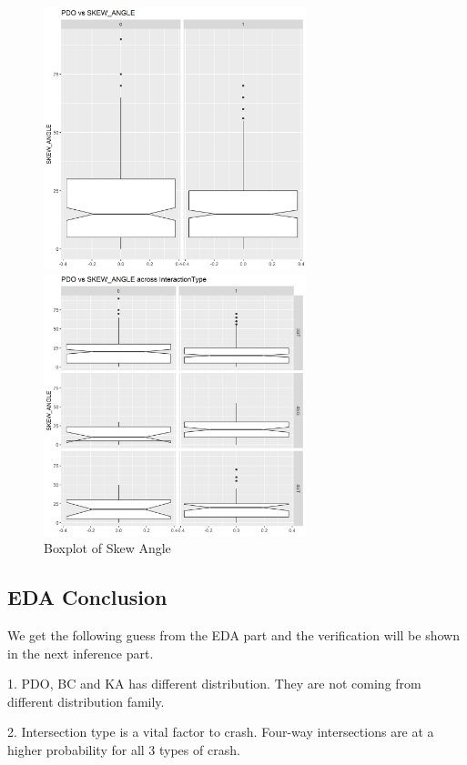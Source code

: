 \documentclass[11pt]{scrartcl} %
\begin{document}
\begin{figure}[H]
\begin{minipage}[t]{0.5\linewidth}
\centering
\includegraphics[width=3in]{image/angle_all_pdo.png}
\small
\end{minipage}
\begin{minipage}[t]{0.5\linewidth}
\centering
\includegraphics[width=3in]{image/angle_pdo.png}
\small
\end{minipage}
\caption{Boxplot of Skew Angle}
\end{figure}

\subsection{EDA Conclusion}

We get the following guess from the EDA part and the verification will be shown in the next inference part.

1. PDO, BC and KA has different distribution. They are not coming from different distribution family.

2. Intersection type is a vital factor to crash. Four-way intersections are at a higher probability for all 3 types of crash.
\end{document}

